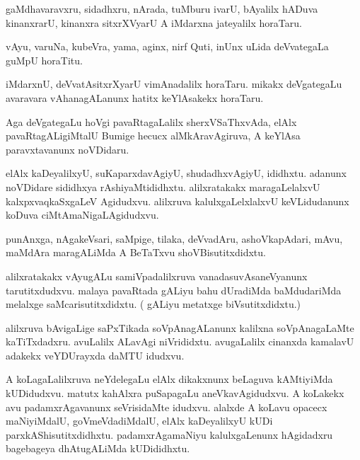 \documentclass{article}
\begin{document}
\begin{mn}%
gaMdhavaravxru, sidadhxru, nArada, tuMburu ivarU, bAyalilx hADuva kinanxrarU, kinanxra 
sitxrXVyarU A iMdarxna jateyalilx horaTaru. 
\end{mn}

\begin{mn}%
vAyu, varuNa, kubeVra, yama, aginx, nirf Quti, inUnx uLida deVvategaLa guMpU horaTitu.
\end{mn}

\begin{mn}%
iMdarxnU, deVvatAsitxrXyarU vimAnadalilx horaTaru. mikakx deVgategaLu avaravara 
vAhanagALanunx hatitx keYlAsakekx horaTaru.
\end{mn}

\begin{mn}%
Aga deVgategaLu hoVgi pavaRtagaLalilx sherxVSaThxvAda, elAlx pavaRtagALigiMtalU Bumige 
hecucx alMkAravAgiruva, A keYlAsa paravxtavanunx noVDidaru.
\end{mn}

\begin{mn}%
elAlx kaDeyalilxyU, suKaparxdavAgiyU, shudadhxvAgiyU, ididhxtu. adanunx noVDidare sididhxya 
rAshiyaMtididhxtu. alilxratakakx maragaLelalxvU kalxpxvaqkaSxgaLeV Agidudxvu. alilxruva 
kalulxgaLelxlalxvU keVLidudanunx koDuva ciMtAmaNigaLAgidudxvu.
\end{mn}

\begin{mn}%
punAnxga, nAgakeVsari, saMpige, tilaka, deVvadAru, ashoVkapAdari, mAvu, maMdAra maragALiMda 
A BeTaTxvu shoVBisutitxdidxtu.
\end{mn}

\begin{mn}%
alilxratakakx vAyugALu samiVpadalilxruva vanadasuvAsaneVyanunx tarutitxdudxvu. malaya 
pavaRtada gALiyu bahu dUradiMda baMdudariMda melalxge saMcarisutitxdidxtu. ( gALiyu 
metatxge biVsutitxdidxtu.)
\end{mn}

\begin{mn}%
alilxruva bAvigaLige saPxTikada soVpAnagALanunx kalilxna soVpAnagaLaMte kaTiTxdadxru. 
avuLalilx ALavAgi niVrididxtu. avugaLalilx cinanxda kamalavU adakekx veYDUrayxda daMTU 
idudxvu.
\end{mn}

\begin{mn}%
A koLagaLalilxruva neYdelegaLu elAlx dikakxnunx beLaguva kAMtiyiMda kUDidudxvu. matutx 
kahAlxra puSapagaLu aneVkavAgidudxvu. A koLakekx avu padamxrAgavanunx seVrisidaMte idudxvu. 
alalxde A koLavu opacecx maNiyiMdalU, goVmeVdadiMdalU, elAlx kaDeyalilxyU kUDi 
parxkAShisutitxdidhxtu. padamxrAgamaNiyu kalulxgaLenunx hAgidadxru bagebageya dhAtugALiMda 
kUDididhxtu.
\end{mn}
\end{document}
